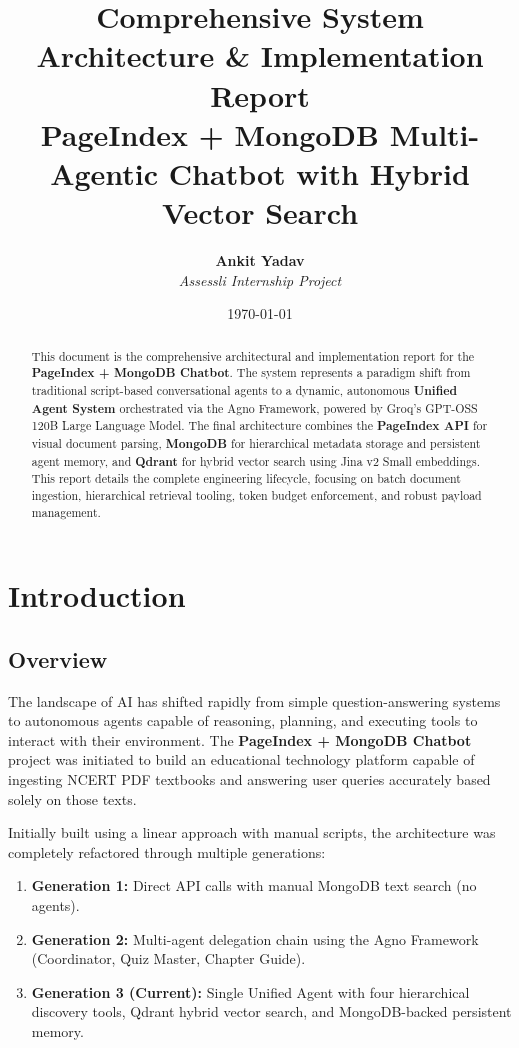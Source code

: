 \documentclass[12pt, a4paper]{article}
\title{\Huge\textbf{Comprehensive System Architecture \& Implementation Report}\\ \vspace{0.5cm} \Large \textbf{PageIndex + MongoDB Multi-Agentic Chatbot with Hybrid Vector Search}}
\author{\textbf{Ankit Yadav} \\ \textit{Assessli Internship Project}}
\date{\today}
\begin{document}
\maketitle
\vspace{2cm}
\begin{abstract}
\noindent This document is the comprehensive architectural and implementation report for the \textbf{PageIndex + MongoDB Chatbot}. The system represents a paradigm shift from traditional script-based conversational agents to a dynamic, autonomous \textbf{Unified Agent System} orchestrated via the Agno Framework, powered by Groq's GPT-OSS 120B Large Language Model. The final architecture combines the \textbf{PageIndex API} for visual document parsing, \textbf{MongoDB} for hierarchical metadata storage and persistent agent memory, and \textbf{Qdrant} for hybrid vector search using Jina v2 Small embeddings. This report details the complete engineering lifecycle, focusing on batch document ingestion, hierarchical retrieval tooling, token budget enforcement, and robust payload management.
\end{abstract}
\thispagestyle{empty}

\newpage
\tableofcontents
\newpage

\section{Introduction}
\subsection{Overview}
The landscape of AI has shifted rapidly from simple question-answering systems to autonomous agents capable of reasoning, planning, and executing tools to interact with their environment. The \textbf{PageIndex + MongoDB Chatbot} project was initiated to build an educational technology platform capable of ingesting NCERT PDF textbooks and answering user queries accurately based solely on those texts.

Initially built using a linear approach with manual scripts, the architecture was completely refactored through multiple generations:
\begin{enumerate}
    \item \textbf{Generation 1:} Direct API calls with manual MongoDB text search (no agents).
    \item \textbf{Generation 2:} Multi-agent delegation chain using the Agno Framework (Coordinator, Quiz Master, Chapter Guide).
    \item \textbf{Generation 3 (Current):} Single Unified Agent with four hierarchical discovery tools, Qdrant hybrid vector search, and MongoDB-backed persistent memory.
\end{enumerate}
\end{document}
